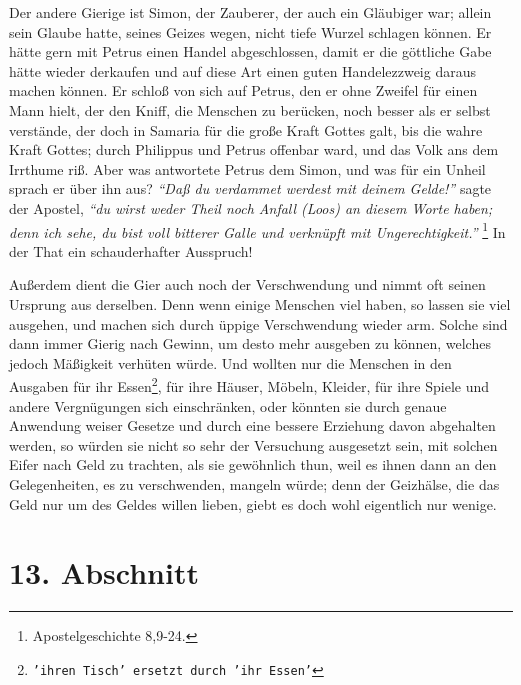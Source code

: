Der andere Gierige ist Simon, der Zauberer, der auch ein
Gläubiger war; allein
sein Glaube hatte, seines Geizes wegen, nicht tiefe Wurzel schlagen können. Er
hätte gern mit Petrus einen Handel abgeschlossen, damit
er die göttliche Gabe
hätte wieder derkaufen und auf diese Art einen guten Handelezzweig daraus machen
können. Er schloß von sich auf Petrus, den er ohne Zweifel für einen Mann hielt,
der den Kniff, die Menschen zu berücken, noch besser als er selbst verstände,
der doch in Samaria für die große Kraft Gottes galt, bis
die wahre Kraft Gottes;
durch Philippus und Petrus offenbar ward, und das
Volk ans dem Irrthume riß.
Aber was antwortete Petrus dem Simon, und was für ein Unheil sprach er über ihn
aus? \textit{"`Daß du verdammet werdest mit deinem Gelde!"'} sagte der Apostel,
\textit{"`du wirst
weder Theil noch Anfall (Loos) an diesem Worte haben; denn ich sehe, du bist
voll bitterer Galle und verknüpft mit Ungerechtigkeit."'}
\footnote{Apostelgeschichte 8,9-24.}
In der That ein schauderhafter Ausspruch!

\medskip

Außerdem dient die Gier auch noch der Verschwendung und
nimmt oft seinen
Ursprung aus derselben. Denn wenn einige Menschen viel haben, so lassen sie viel
ausgehen, und machen sich durch üppige Verschwendung wieder arm. Solche sind
dann immer Gierig nach Gewinn, um desto mehr ausgeben zu können, welches jedoch
Mäßigkeit verhüten würde. Und wollten nur die Menschen in den Ausgaben für ihr
Essen\footnote{\texttt{'ihren Tisch' ersetzt durch 'ihr Essen'}}, für ihre
Häuser, Möbeln, Kleider, für ihre
Spiele und andere Vergnügungen
sich einschränken, oder könnten sie durch genaue Anwendung weiser Gesetze und
durch eine bessere Erziehung davon abgehalten werden, so würden
sie nicht so
sehr der Versuchung ausgesetzt sein, mit solchen Eifer nach
Geld zu trachten,
als sie gewöhnlich thun, weil es ihnen dann an den
Gelegenheiten, es zu
verschwenden, mangeln würde; denn der Geizhälse, die das Geld nur um des Geldes
willen lieben, giebt es doch wohl eigentlich nur wenige.

\section{13. Abschnitt} \label{kap13_ab13}

